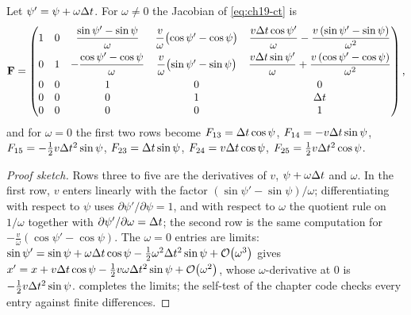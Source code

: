 \begin{proposition}
\label{thm:ch19-ct-jacobian}
Let $\psi' = \psi + \omega\Delta t$. For $\omega \ne 0$ the Jacobian of
\cref{eq:ch19-ct} is
\begin{equation}
  \mathbf{F} =
  \begin{pmatrix}
    1 & 0 & \dfrac{\sin\psi' - \sin\psi}{\omega}
      & \dfrac{v}{\omega}\bigl(\cos\psi' - \cos\psi\bigr)
      & \dfrac{v\Delta t\cos\psi'}{\omega} - \dfrac{v\,(\sin\psi' - \sin\psi)}{\omega^2}\\[1.6ex]
    0 & 1 & -\dfrac{\cos\psi' - \cos\psi}{\omega}
      & \dfrac{v}{\omega}\bigl(\sin\psi' - \sin\psi\bigr)
      & \dfrac{v\Delta t\sin\psi'}{\omega} + \dfrac{v\,(\cos\psi' - \cos\psi)}{\omega^2}\\[1.6ex]
    0 & 0 & 1 & 0 & 0\\
    0 & 0 & 0 & 1 & \Delta t\\
    0 & 0 & 0 & 0 & 1
  \end{pmatrix},
  \label{eq:ch19-ct-jacobian}
\end{equation}
and for $\omega = 0$ the first two rows become
$F_{13} = \Delta t\cos\psi$, $F_{14} = -v\Delta t\sin\psi$,
$F_{15} = -\tfrac12 v\Delta t^2\sin\psi$, $F_{23} = \Delta t\sin\psi$,
$F_{24} = v\Delta t\cos\psi$, $F_{25} = \tfrac12 v\Delta t^2\cos\psi$.
\end{proposition}
\begin{proof}[Proof sketch]
Rows three to five are the derivatives of $v$, $\psi + \omega\Delta t$ and
$\omega$. In the first row, $v$ enters linearly with the factor
$(\sin\psi' - \sin\psi)/\omega$; differentiating with respect to $\psi$ uses
$\partial\psi'/\partial\psi = 1$, and with respect to $\omega$ the quotient
rule on $1/\omega$ together with $\partial\psi'/\partial\omega = \Delta t$; the
second row is the same computation for $-\frac{v}{\omega}(\cos\psi' -
\cos\psi)$. The $\omega = 0$ entries are limits: $\sin\psi' = \sin\psi +
\omega\Delta t\cos\psi - \tfrac12\omega^2\Delta t^2\sin\psi + \mathcal{O}\!\left(\omega^3\right)$ gives
$x' = x + v\Delta t\cos\psi - \tfrac12 v\omega\Delta t^2\sin\psi + \mathcal{O}\!\left(\omega^2\right)$,
whose $\omega$-derivative at $0$ is $-\tfrac12 v\Delta t^2\sin\psi$.
 completes the limits; the self-test of the
chapter code checks every entry against finite differences.
\end{proof}

